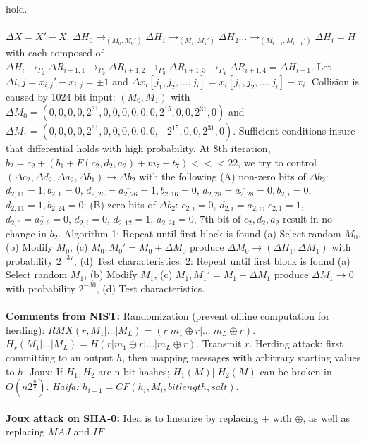 hold.
\\
\\
$\Delta X = X' - X$.
$\Delta H_0 \rightarrow_{(M_0, M_0')} \Delta H_1 \rightarrow_{(M_1, M_1')} 
\Delta H_2 \ldots \rightarrow_{(M_{i-1}, M_{i-1}')} 
\Delta H_i = H$ with each composed of
$\Delta H_i \rightarrow_{P_2} \Delta R_{i+1,1} 
\rightarrow_{P_2} \Delta R_{i+1,2} \rightarrow_{P_3} \Delta R_{i+1,3} 
\rightarrow_{P_4} \Delta R_{i+1,4} = \Delta H_{i+1}$.
Let $\Delta{i,j}= x_{i,j}' - x_{i,j} = \pm 1$ and
$\Delta x_{i}[ j_1 , j_2 , \ldots , j_l ]= x_{i}[ j_1 , j_2 , \ldots , j_l] - x_{i}$.
Collision is caused by 1024 bit input: $(M_0, M_1)$ with
$\Delta M_0= (0,0,0,0,2^{31}, 0,0,0,0,0,0,2^{15},0,0,2^{31},0)$ and
$\Delta M_1= (0,0,0,0,2^{31}, 0,0,0,0,0,0,-2^{15},0,0,2^{31},0)$.  
Sufficient conditions
insure that differential holds with high probability.  At 8th iteration, 
$b_2= c_2+(b_1+F(c_2,d_2,a_2)+m_7+t_7)<<<22$,
we try to control 
$(\Delta c_2 , \Delta d_2, \Delta a_2, \Delta b_1) \rightarrow \Delta b_2$ with the
following (A) non-zero bits of $\Delta b_2$:
$d_{2,11}=1, b_{2,1}=0$,
$d_{2,26}= {\overline {a_{2,26}}}=1, b_{2,16}=0$,
$d_{2,28}= {\overline {a_{2,28}}}=0, b_{2,i}=0$,
$d_{2,11}=1, b_{2,24}=0$;
(B) zero bits of $\Delta b_2$:
$c_{2,i}=0$,
$d_{2,i}= a_{2,i}$,
$c_{2,1}=1$,
$d_{2,6}={\overline {a_{2,6}}}=0$,
$d_{2,i}= 0$,
$d_{2,12}= 1$,
$a_{2,24}= 0$, 
7th bit of $c_2, d_2, a_2$ result in no change in $b_2$.
Algorithm 1: Repeat until first block is found (a) Select random $M_0$, 
(b) Modify $M_0$,
(c) $M_0, M_0'= M_0 + \Delta M_0$ produce $\Delta M_0 \rightarrow (\Delta H_1, \Delta M_1)$
with probability $2^{-37}$, (d) Test characteristics.
2: Repeat until first block is found (a) Select random $M_1$, 
(b) Modify $M_1$,
(c) $M_1, M_1'= M_1 + \Delta M_1$ produce $\Delta M_1 \rightarrow 0$
with probability $2^{-30}$, (d) Test characteristics.
\\
\\
{\bf Comments from NIST:} Randomization (prevent offline computation for herding):
$RMX(r, M_1 | \ldots | M_L)= (r| m_1 \oplus r | \ldots | m_L \oplus r)$.
$H_r(M_1 | \ldots | M_L)= H(r| m_1 \oplus r | \ldots | m_L \oplus r)$.  Transmit $r$.
Herding attack: first committing to an output $h$, 
then mapping messages with arbitrary starting values to $h$.  Joux:  If
$H_1, H_2$ are n bit hashes;  $H_1(M) || H_2(M)$ can be broken in
$O(n2^{\frac n 2})$.  \emph{Haifa:} $h_{i+1} = CF(h_i , M_i , bitlength, salt)$.
\\
\\
{\bf Joux attack on SHA-0: }
Idea is to linearize by replacing $+$ with $\oplus$, as well as replacing $MAJ$ and $IF$
